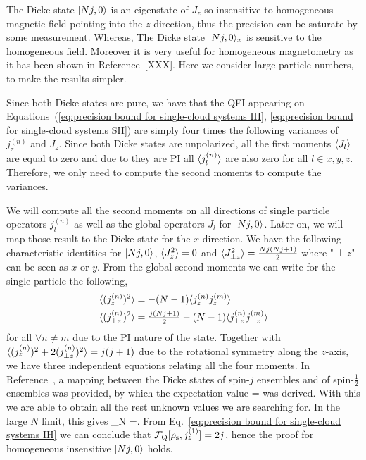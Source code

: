 The Dicke state $\vert Nj, 0 \rangle$ is an eigenstate of $J_z$ so insensitive to homogeneous magnetic field pointing into the $z$-direction, thus the precision can be saturate by some measurement.
Whereas, The Dicke state $\vert Nj, 0 \rangle_x$ is sensitive to the homogeneous field.
Moreover it is very useful for homogeneous magnetometry as it has been shown in Reference~[XXX].
Here we consider large particle numbers, to make the results simpler.

Since both Dicke states are pure, we have that
the QFI appearing on Equations~(\ref{eq:precision bound for single-cloud
systems IH}, \ref{eq:precision bound for single-cloud
systems SH}) are simply four times the following variances of $j_z^{(n)}$ and $J_z$.
Since both Dicke states are unpolarized, all the first moments $\langle J_l \rangle$ are equal to zero and due to they are PI all $\langle j_l^{(n)} \rangle$ are also zero for all $l\in x,y,z$.
Therefore, we only need to compute the second moments to compute the variances.


We will compute all the second moments on all directions of single particle operators $j_l^{(n)}$ as well as the global operators $J_l$ for $\vert Nj,0 \rangle$.
Later on, we will map those result to the Dicke state for the $x$-direction.
We have the following characteristic identities for $\vert Nj,0 \rangle$, $\langle J_z^2 \rangle = 0$ and $\langle J_{\perp z}^2 \rangle = \frac{Nj(Nj+1)}{2}$ where "${\perp}{z}$" can be seen as $x$ or $y$.
From the global second moments we can write for the single particle the following,
\begin{align}
  \langle (j_z^{(n)})^2 \rangle &= -(N-1)\langle j_z^{(n)}j_z^{(m)} \rangle \\
  \langle (j_{\perp z}^{(n)})^2 \rangle &= \tfrac{j(Nj+1)}{2}-(N-1)\langle j_{\perp z}^{(n)}j_{\perp z}^{(m)} \rangle
\end{align}
for all $\forall n\neq m$ due to the PI nature of the state.
Together with $\langle (j_z^{(n)})^2+2(j_{\perp z}^{(n)})^2 \rangle = j(j+1)$ due to the rotational symmetry along the $z$-axis, we have three independent equations relating all the four moments.
In Reference~\citep{Urizar-Lanz2013}, a mapping between the Dicke states of spin-$j$ ensembles and of spin-$\frac{1}{2}$ ensembles was provided, by which the expectation value
\be
  = 
\ee
was derived.
With this we are able to obtain all the rest unknown values we are searching for.
In the large $N$ limit, this gives
\be
\label{eq:jz2 for dicke state large number of particles}
\lim_{N \to \infty} =.
\ee
From Eq.~\eqref{eq:precision bound for single-cloud
systems IH} we can conclude that $\mathcal{F}_{\textnormal{Q}}[{\textstyle \rho_{\rm s},j_z^{(1)}}]=2j$,
hence the proof for homogeneous insensitive $\vert Nj,0 \rangle$ holds.

